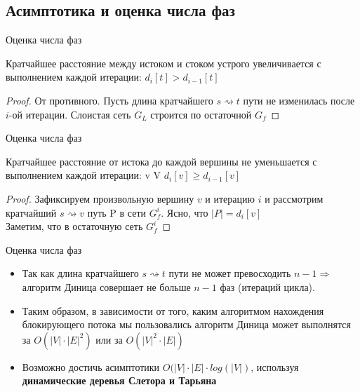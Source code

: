 \documentclass{beamer}
\begin{document}
\subsection{Асимптотика и оценка числа фаз}

\begin{frame}{Оценка числа фаз}
\begin{lemma}
        Кратчайшее расстояние между истоком и стоком устрого увеличивается с выполнением каждой итерации:
        \texttt{$d_{i}[t] > d_{i-1}[t] $}
    \end{lemma}
    
    \begin{proof}
        От противного. Пусть длина кратчайшего $s \rightsquigarrow t$ пути не изменилась после $i$-ой итерации.
        Слоистая сеть $G_{L}$ строится по остаточной $G_{f}$ 
        
    \end{proof}
\end{frame}

\begin{frame}{Оценка числа фаз}
    \begin{lemma}
        Кратчайшее расстояние от истока до каждой вершины не уменьшается с выполнением каждой итерации:
        \forall v \in V \quad \texttt{$d_{i}[v] \geq d_{i-1}[v] $}
    \end{lemma}
    
    \begin{proof}
        Зафиксируем произвольную вершину $v$ и итерацию $i$ и рассмотрим кратчайший $s \rightsquigarrow v$ путь P в сети $G^{i}_{f}$. Ясно, что $|P| = d_{i}[v]$\\
        \pause
        Заметим, что в остаточную сеть $G^{i}_{f}$
    \end{proof}
\end{frame}

\begin{frame}{Оценка числа фаз}
    \begin{itemize}
    \item {
        Так как длина кратчайшего $s \rightsquigarrow t$ пути не может превосходить $n - 1 \Rightarrow$ алгоритм Диница совершает не больше $n - 1$ фаз (итераций цикла).
        \pause
    }
    \item {
        Таким образом, в зависимости от того, каким алгоритмом нахождения блокирующего потока мы пользовались алгоритм Диница может выполнятся за $O(|V| \cdot |E|^{2})$ или за $O(|V|^{2} \cdot |E|)$\\
        \pause
    }
    \item {
        Возможно достичь асимптотики $O(|V| \cdot |E| \cdot log(|V|)$, используя \textbf{динамические деревья Слетора и Тарьяна}
    }


    \end{itemize}
\end{frame}
\end{document}
